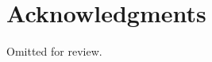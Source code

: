 \documentclass{sigchi}
\begin{document}
\section{Acknowledgments}

Omitted for review.

%
%
%
%
%
\balance{}




\end{document}
